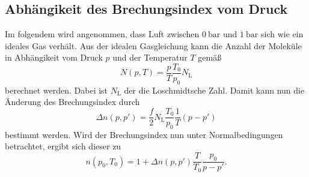 \subsection{Abhängikeit des Brechungsindex vom Druck}
\label{subsec:Brechungsindex}
Im folgendem wird angenommen, dass Luft zwischen $\qty{0}{\bar}$ und $\qty{1}{\bar}$ sich wie ein ideales Gas verhält. Aus der idealen Gasgleichung kann die Anzahl der Moleküle
in Abhängikeit vom Druck $p$ und der Temperatur $T$ gemäß 
\begin{equation*}
    N(p,T) = \frac{p}{T}\frac{T_0}{p_0}N_\text{L}
\end{equation*}
berechnet werden. Dabei ist $N_\text{L}$ der die Loschmidtsche Zahl. 
Damit kann nun die Änderung des Brechungsindex durch 
\begin{equation*}
    \Delta n(p,p') = \frac{f}{2}N_\text{L}\frac{T_0}{p_0}\frac{1}{T}(p - p')
\end{equation*}
bestimmt werden.
Wird der Brechungsindex nun unter Normalbedingungen betrachtet, ergibt sich dieser zu 
\begin{equation}
    \label{eqn:Brechungsindex}
    n(p_0, T_0) = 1 + \Delta n(p,p')\frac{T}{T_0}\frac{p_0}{p - p'}.
\end{equation}
